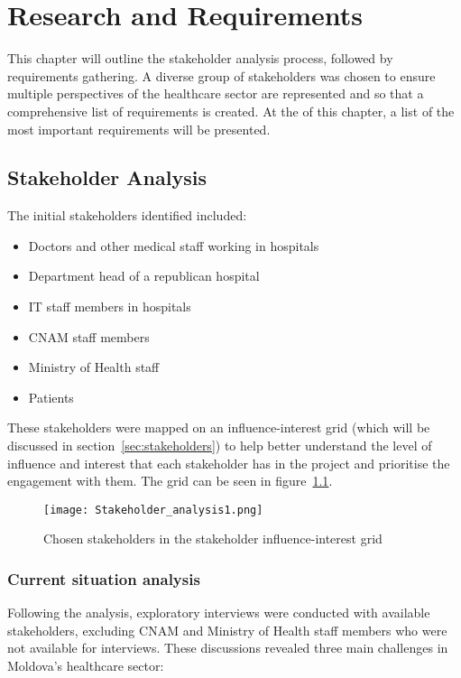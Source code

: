 \chapter{Research and Requirements}

This chapter will outline the stakeholder analysis process, followed by requirements gathering. A diverse group of stakeholders was chosen to ensure multiple perspectives of the healthcare sector are represented and so that a comprehensive list of requirements is created. At the of this chapter, a list of the most important requirements will be presented.

\section{Stakeholder Analysis}

The initial stakeholders identified included:

\begin{itemize}
    \item Doctors and other medical staff working in hospitals
    \item Department head of a republican hospital
    \item IT staff members in hospitals
    \item CNAM staff members
    \item Ministry of Health staff
    \item Patients 
\end{itemize}

These stakeholders were mapped on an influence-interest grid (which will be discussed in section~\ref{sec:stakeholders}) to help better understand the level of influence and interest that each stakeholder has in the project and prioritise the engagement with them. The grid can be seen in figure~\ref{fig:stakeholder_analysis1}.

\begin{figure}[ht]
    \centering
    \texttt{[image: Stakeholder\_analysis1.png]}
    \caption{Chosen stakeholders in the stakeholder influence-interest grid}\label{fig:stakeholder_analysis1}
\end{figure}

\subsection{Current situation analysis}

Following the analysis, exploratory interviews were conducted with available stakeholders, excluding CNAM and Ministry of Health staff members who were not available for interviews. These discussions revealed three main challenges in Moldova's healthcare sector:

